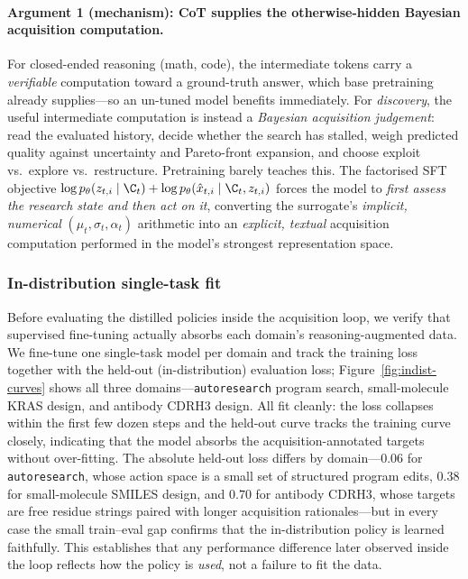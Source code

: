 \paragraph{Argument 1 (mechanism): CoT supplies the otherwise-hidden Bayesian acquisition computation.}
For closed-ended reasoning (math, code), the intermediate tokens carry a \emph{verifiable} computation toward a
ground-truth answer, which base pretraining already supplies---so an un-tuned model benefits immediately. For
\emph{discovery}, the useful intermediate computation is instead a \emph{Bayesian acquisition judgement}: read
the evaluated history, decide whether the search has stalled, weigh predicted quality against uncertainty and
Pareto-front expansion, and choose exploit vs.\ explore vs.\ restructure. Pretraining barely teaches this. The
factorised SFT objective $\log p_\theta(z_{t,i}\mid\C_t)+\log p_\theta(\hat{x}_{t,i}\mid\C_t,z_{t,i})$ forces the
model to \emph{first assess the research state and then act on it}, converting the surrogate's
\emph{implicit, numerical} $(\mu_t,\sigma_t,\alpha_t)$ arithmetic into an \emph{explicit, textual} acquisition
computation performed in the model's strongest representation space.

\subsubsection{In-distribution single-task fit}
\label{sec:finetune-indist}

Before evaluating the distilled policies inside the acquisition loop, we verify that supervised fine-tuning
actually absorbs each domain's reasoning-augmented data. We fine-tune one single-task model per domain and track
the training loss together with the held-out (in-distribution) evaluation loss; Figure~\ref{fig:indist-curves}
shows all three domains---\texttt{autoresearch} program search, small-molecule KRAS design, and antibody CDRH3
design. All fit cleanly: the loss collapses within the first few dozen steps and the held-out curve tracks the
training curve closely, indicating that the model absorbs the acquisition-annotated targets without over-fitting.
The absolute held-out loss differs by domain---$0.06$ for \texttt{autoresearch}, whose action space is a small
set of structured program edits, $0.38$ for small-molecule SMILES design, and $0.70$ for antibody CDRH3, whose
targets are free residue strings paired with longer acquisition rationales---but in every case the small
train--eval gap confirms that the in-distribution policy is learned faithfully. This establishes that any performance difference
later observed inside the loop reflects how the policy is \emph{used}, not a failure to fit the data.

